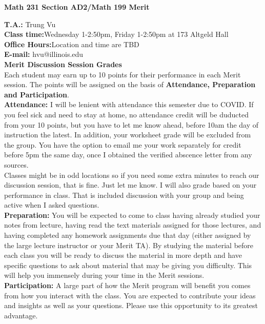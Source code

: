 \documentclass[12pt]{article}
\begin{document}
\begin{center}
\textbf{Math 231 Section AD2/Math 199 Merit}
\end{center}

\noindent \textbf{T.A.:} Trung Vu\\	
\textbf{Class time:}Wednesday 1-2:50pm, Friday 1-2:50pm at 173 Altgeld Hall \\
\textbf{Office Hours:}Location and time are TBD \\
\textbf{E-mail:} hvu@illinois.edu\\

\noindent \textbf{Merit Discussion Session Grades}\\
Each student may earn up to 10 points for their performance in each Merit session. The points will be assigned on the basis of \textbf{Attendance, Preparation and Participation}.\\

\textbf{Attendance:} I will be lenient with attendance this semester due to COVID. If you feel sick and need to stay at home, no attendance credit will be duducted from your 10 points, but you have to let me know ahead, before 10am the day of instruction the latest. In addition, your worksheet grade will be excluded from the group. You have the option to email me your work separately for credit before 5pm the same day, once I obtained the verified abscence letter from any sources.\\
Classes might be in odd locations so if you need some extra minutes to reach our discussion session, that is fine. Just let me know. I will also grade based on your performance in class. That is included discussion with your group and being active when I asked questions. \\

\textbf{Preparation:} You will be expected to come to class having already studied your notes from lecture, having read the text materials assigned for those lectures, and having completed any homework assignments due that day (either assigned by the large lecture instructor or your Merit TA). By studying the material before each class you will be ready to discuss the material in more depth and have specific questions to ask about material that may be giving you difficulty. This will help you immensely during your time in the Merit sessions.\\

\textbf{Participation:}  A large part of how the Merit program will benefit you comes from how you interact with the class.  You are expected to contribute your ideas and insights as well as your questions.  Please use this opportunity to its greatest advantage.\\
\end{document}
